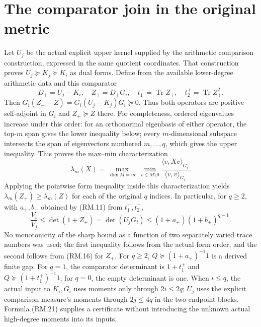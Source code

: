 \documentclass[11pt]{article}
\newcommand{\Tr}{\operatorname{Tr}}\newcommand{\im}{\operatorname{im}}
\begin{document}
\section{The comparator join in the original metric}
Let $U_j$ be the actual explicit upper kernel supplied by the arithmetic
comparison construction, expressed in the same quotient coordinates.
That construction proves $U_j\succeq K_j\succeq K_i$ as dual forms.
Define from the available lower-degree arithmetic data and this comparator
\begin{equation}
 D_+=U_j-K_i,\quad Z_+=D_+G_i,\quad
 t_1^+=\Tr Z_+,\quad t_2^+=\Tr Z_+^2.\tag{RM.20}
\end{equation}
Then $G_i(Z_+-Z)=G_i(U_j-K_j)G_i\succeq0$. Thus both operators are
positive self-adjoint in $G_i$ and $Z_+\succeq Z$ there. For completeness,
ordered eigenvalues increase under this order: for an orthonormal eigenbasis
of either operator, the top-$m$ span gives the lower inequality below;
every $m$-dimensional subspace intersects the span of eigenvectors numbered
$m,\ldots,q$, which gives the upper inequality. This proves the max--min characterization
\[
 \lambda_m(X)=\max_{\dim M=m}\ \min_{v\in M\setminus0}
 \frac{\langle v,Xv\rangle_{G_i}}{\langle v,v\rangle_{G_i}}.
\]
Applying the pointwise form inequality inside this characterization yields
$\lambda_m(Z_+)\ge\lambda_m(Z)$ for each of the original $q$ indices.
In particular, for $q\ge2$, with $a_+,b_+$ obtained by (RM.11) from $t_1^+,t_2^+$,
\begin{equation}
 \frac{V_i}{V_j}\le\det(1+Z_+)=\det(U_jG_i)
 \le(1+a_+)(1+b_+)^{q-1}.\tag{RM.21}
\end{equation}
No monotonicity of the sharp bound as a function of two separately varied
trace numbers was used; the first inequality follows from the actual form
order, and the second follows from (RM.16) for $Z_+$.
For $q\ge2$, $Q\succeq(1+a_+)^{-1}1$ is a derived finite gap.
For $q=1$, the comparator determinant is $1+t_1^+$ and
$Q\succeq(1+t_1^+)^{-1}1$; for $q=0$, the empty determinant is one.
When $i\le q$, the actual input to $K_i,G_i$ uses moments only through
$2i\le2q$; $U_j$ uses the explicit comparison measure's moments through
$2j\le4q$ in the two endpoint blocks. Formula (RM.21) supplies a certificate
without introducing the unknown actual high-degree moments into its inputs.
\end{document}
